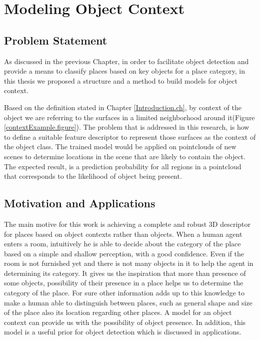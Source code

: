 \chapter{Modeling Object Context}
\label{ModelingObjectContext.ch}
\section{Problem Statement}
\label{ProblemStatement.sec}
As discussed in the previous Chapter, in order to facilitate object detection and provide a means to classify places based on key objects 
for a place category, in this thesis we proposed a structure and a method to build models for object context. 

Based on the definition stated in Chapter \ref{Introduction.ch}, by context of the object we are referring to the surfaces 
in a limited neighborhood around it(Figure \ref{contextExample.figure}). 
The problem that is addressed in this research, is how to define a suitable feature descriptor to represent those surfaces 
as the context of the object class. 
The trained model would be applied on pointclouds of new scenes to determine locations in the scene that are likely
to contain the object.
The expected result, is a prediction probability for all regions in a pointcloud that corresponds to the likelihood 
of object being present.





\section{Motivation and Applications}
\label{MotivationandApplications.sec}
The main motive for this work is achieving a complete and robust 3D descriptor for places based on object contexts 
rather than objects. 
When a human agent enters a room, intuitively he is able to decide about the category of the place based on a simple and 
shallow perception, with a good confidence. 
Even if the room is not furnished yet and there is not many objects in it to help the agent in determining its 
category. 
It gives us the inspiration that more than presence of some objects, possibility of their presence in a place helps us 
to determine the category of the place.
For sure other information adds up to this knowledge to make a human able to distinguish between places, such as general 
shape and size of the place also its location regarding other places. 
A model for an object context can provide us with the possibility of object presence.
In addition, this model is a useful prior for object detection which is discussed in applications.

